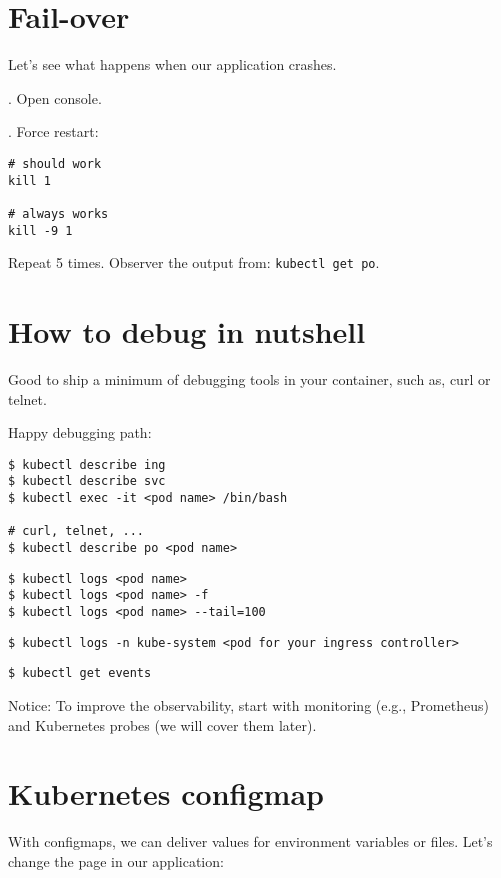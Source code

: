 \documentclass[12pt, letterpaper]{article}
\begin{document}
\bigskip
\bigskip

\section{Fail-over}
Let's see what happens when our application crashes.

. Open console.

. Force restart:

\begin{verbatim}
# should work
kill 1

# always works
kill -9 1
\end{verbatim}

Repeat 5 times. Observer the output from: \verb|kubectl get po|.

%
\section{How to debug in nutshell}

Good to ship a minimum of debugging tools in your container, such as, curl or telnet.

Happy debugging path:

\begin{verbatim}
$ kubectl describe ing
$ kubectl describe svc
$ kubectl exec -it <pod name> /bin/bash

# curl, telnet, ...
$ kubectl describe po <pod name>
\end{verbatim}

\begin{verbatim}
$ kubectl logs <pod name>
$ kubectl logs <pod name> -f
$ kubectl logs <pod name> --tail=100
\end{verbatim}

\begin{verbatim}
$ kubectl logs -n kube-system <pod for your ingress controller>
\end{verbatim}

\begin{verbatim}
$ kubectl get events
\end{verbatim}

\bigskip
Notice: To improve the observability, start with monitoring (e.g., Prometheus) and Kubernetes probes (we will cover them later).
%
%
\pagebreak
\section{Kubernetes configmap}

With configmaps, we can deliver values for environment variables or files. Let's change the page in our application:
\end{document}
